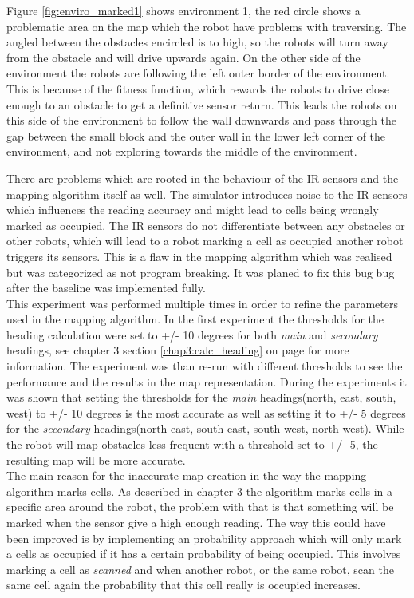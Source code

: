 Figure \ref{fig:enviro_marked1} shows environment 1, the red circle shows a  problematic area on the map which the robot have problems with traversing.
The angled between the obstacles encircled is to high, so the robots will turn away from the obstacle and will drive upwards again. 
On the other side of the environment the robots are following the left outer border of the environment. This is because of the fitness function, which rewards the robots to drive close enough to an obstacle to get a definitive sensor return. 
This leads the robots on this side of the environment to follow the wall downwards and pass through the gap between the small block and the outer wall in the lower left corner of the environment, and not exploring towards the middle of the environment.

There are problems which are rooted in the behaviour of the IR sensors and the mapping algorithm itself as well.
The simulator introduces noise to the IR sensors which influences the reading accuracy and might lead to cells being wrongly marked as occupied. 
The IR sensors do not differentiate between any obstacles or other robots, 
which will lead to a robot marking a cell as occupied another robot triggers its sensors. This is a flaw in the mapping algorithm which was realised but was categorized as not program breaking. It was planed to fix this bug bug after the baseline was implemented fully. \\ 

This experiment was performed multiple times in order to refine the parameters used in the mapping algorithm. In the first experiment the thresholds for the heading calculation were set to +/- 10 degrees for both \textit{main} and \textit{secondary} headings, see chapter 3 section \ref{chap3:calc_heading} on page \pageref{chap3:calc_heading} for more information. 
The experiment was than re-run with different thresholds to see the performance and the results in the map representation. 
During the experiments it was shown that setting the thresholds for the \textit{main} headings(north, east, south, west) to +/- 10 degrees is the most accurate as well as setting it to +/- 5 degrees for the \textit{secondary} headings(north-east, south-east, south-west, north-west).
While the robot will map obstacles less frequent with a threshold set to +/- 5, the resulting map will be more accurate. \\

The main reason for the inaccurate map creation in the way the mapping algorithm marks cells. As described in chapter 3 the algorithm marks cells in a specific area around the robot, the problem with that is that something will be marked when the sensor give a high enough reading. 
The way this could have been improved is by implementing an probability approach which will only mark a cells as occupied if it has a certain probability of being occupied. This involves marking a cell as \textit{scanned} and when another robot, or the same robot, scan the same cell again the probability that this cell really is occupied increases. 

